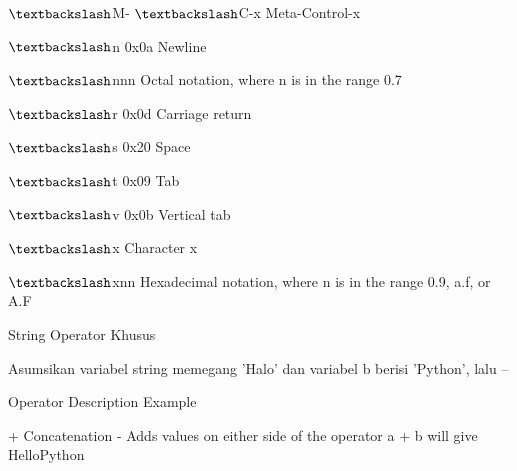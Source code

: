  $  \textbackslash  $M- $  \textbackslash  $C-x \hspace*{0.5in}   \hspace*{0.5in} Meta-Control-x \par
 $  \textbackslash  $n \hspace*{0.5in} 0x0a \hspace*{0.5in} Newline \par
 $  \textbackslash  $nnn \hspace*{0.5in}   \hspace*{0.5in} Octal notation, where n is in the range 0.7 \par
 $  \textbackslash  $r \hspace*{0.5in} 0x0d \hspace*{0.5in} Carriage return \par
 $  \textbackslash  $s \hspace*{0.5in} 0x20 \hspace*{0.5in} Space \par
 $  \textbackslash  $t \hspace*{0.5in} 0x09 \hspace*{0.5in} Tab \par
 $  \textbackslash  $v \hspace*{0.5in} 0x0b \hspace*{0.5in} Vertical tab \par
 $  \textbackslash  $x \hspace*{0.5in}   \hspace*{0.5in} Character x \par
 $  \textbackslash  $xnn \hspace*{0.5in}   \hspace*{0.5in} Hexadecimal notation, where n is in the range 0.9, a.f, or A.F \par
\vspace{12pt}
String Operator Khusus \par
\vspace{12pt}
Asumsikan variabel string memegang 'Halo' dan variabel b berisi 'Python', lalu – \par
\vspace{12pt}
Operator \hspace*{0.5in} Description \hspace*{0.5in} Example \par
+ \hspace*{0.5in} Concatenation - Adds values on either side of the operator \hspace*{0.5in} a + b will give HelloPython \par
